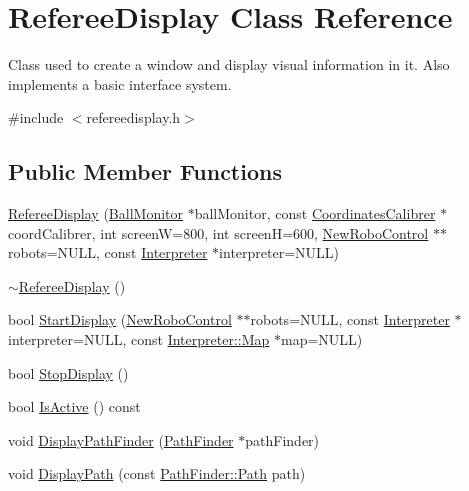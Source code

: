 \hypertarget{classRefereeDisplay}{
\section{RefereeDisplay Class Reference}
\label{classRefereeDisplay}
}


Class used to create a window and display visual information in it. Also implements a basic interface system.  




{\ttfamily \#include $<$refereedisplay.h$>$}

\subsection*{Public Member Functions}
\begin{DoxyCompactItemize}
\item 
\hyperlink{classRefereeDisplay_a8f7d4872a24b44b96a36a5bbf991f5d2}{RefereeDisplay} (\hyperlink{classBallMonitor}{BallMonitor} $\ast$ballMonitor, const \hyperlink{classCoordinatesCalibrer}{CoordinatesCalibrer} $\ast$coordCalibrer, int screenW=800, int screenH=600, \hyperlink{classNewRoboControl}{NewRoboControl} $\ast$$\ast$robots=NULL, const \hyperlink{classInterpreter}{Interpreter} $\ast$interpreter=NULL)
\item 
\hyperlink{classRefereeDisplay_a5a9191c0d7f937df62ea9544d9e38f3b}{$\sim$RefereeDisplay} ()
\item 
bool \hyperlink{classRefereeDisplay_a6b789ef1ca73c72556cf5051a8a2b5a6}{StartDisplay} (\hyperlink{classNewRoboControl}{NewRoboControl} $\ast$$\ast$robots=NULL, const \hyperlink{classInterpreter}{Interpreter} $\ast$interpreter=NULL, const \hyperlink{classMatrix}{Interpreter::Map} $\ast$map=NULL)
\item 
bool \hyperlink{classRefereeDisplay_aafa710132ce88c4e6cb4d430baf26173}{StopDisplay} ()
\item 
bool \hyperlink{classRefereeDisplay_a216bbade42b7c7694f69d73c35620fc6}{IsActive} () const 
\item 
void \hyperlink{classRefereeDisplay_a0ef334a53e0fde02da30460ed2fcbe06}{DisplayPathFinder} (\hyperlink{classPathFinder}{PathFinder} $\ast$pathFinder)
\item 
void \hyperlink{classRefereeDisplay_ad7f07077e92fd46956bf1aa25715e414}{DisplayPath} (const \hyperlink{classPathFinder_a269aba09b7b3208092f67f2bc02cf63e}{PathFinder::Path} path)
\end{DoxyCompactItemize}
